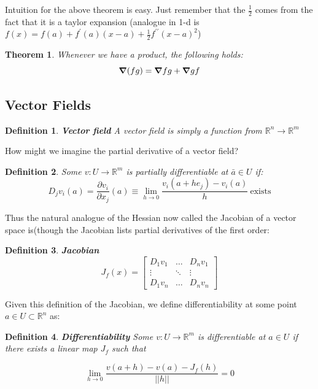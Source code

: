 \documentclass[titlepage]{article}
\newtheorem{theorem}{Theorem}[section]
\newtheorem{definition}{Definition}
\newcommand{\Rn}{\mathbb{R}^n}
\newcommand{\Rm}{\mathbb{R}^m}
\begin{document}
Intuition for the above theorem is easy. Just remember that the $\frac{1}{2}$ comes from the fact that it is a taylor expansion (analogue in 1-d is $f(x) = f(a) + f^{\prime}(a)(x-a) + \frac{1}{2} f^{\prime\prime}(x-a)^2$)


\begin{theorem}
Whenever we have a product, the following holds:
$$\grad(fg) = \grad fg + \grad gf$$
\end{theorem}
\subsection{Vector Fields}

\begin{definition}\textbf{Vector field}
A vector field is simply a function from $\mathbb{R}^{n} \to \Rm$
\end{definition}

How might we imagine the partial derivative of a vector field?

\begin{definition}
Some $v: U \to \Rm$ is partially differentiable at $\bar{a} \in U$ if:
$$D_{j}v_{i}(a) = \frac{\partial v_{i}}{\partial x_{j}}(a) \equiv \lim_{h \to 0} \frac{v_{i}(a+he_{j})-v_{i}(a)}{h} \ \text{exists}$$
\end{definition}

Thus the natural analogue of the Hessian now called the Jacobian of a vector space is(though the Jacobian lists partial derivatives of the first order:
\begin{definition}\textbf{Jacobian}
$$ J_{f}(x) = 
\begin{bmatrix}
 D_{1}v_{1} & \ldots & D_{n}v_{1}\\
 \vdots & \ddots & \vdots\\
 D_{1}v_{n} & \ldots & D_{n}v_{n}
\end{bmatrix}
$$
\end{definition}

Given this definition of the Jacobian, we define differentiability at some point $a \in U \subset \Rn$ as:

\begin{definition} \textbf{Differentiability}
Some $v: U \to \Rm$ is differentiable at $a \in U$ if there exists a linear map $J_{f}$ such that

$$\lim_{h \to 0} \frac{v(a+h) - v(a) - J_{f}(h)}{||h||} = 0$$

\end{definition}
\end{document}
